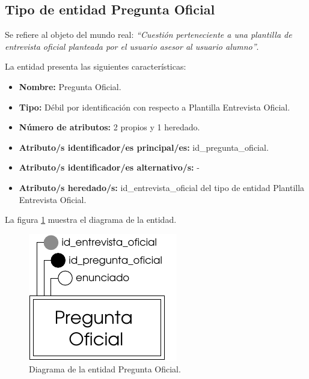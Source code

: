\subsection{Tipo de entidad Pregunta Oficial}

   \begin{description}

   \item[Definición] Se refiere al objeto del mundo real: \emph{``Cuestión
   perteneciente a una plantilla de entrevista oficial planteada por el usuario
   asesor al usuario alumno''}.

   \item[Características] La entidad presenta las siguientes características:
      \begin{itemize}
         \item \textbf{Nombre:} Pregunta Oficial.
         \item \textbf{Tipo:} Débil por identificación con respecto a
         Plantilla Entrevista Oficial.
         \item \textbf{Número de atributos:} 2 propios y 1 heredado.
         \item \textbf{Atributo/s identificador/es principal/es:} id\_pregunta\_oficial.
         \item \textbf{Atributo/s identificador/es alternativo/s:} -
         \item \textbf{Atributo/s heredado/s:} id\_entrevista\_oficial del tipo
         de entidad Plantilla Entrevista Oficial.
      \end{itemize}

   \item[Diagrama] La figura \ref{diagramaPregOfi} muestra el diagrama de la entidad.
   \item \begin{figure}[!ht]
            \begin{center}
            \includegraphics[]{07.Modelo_Entidad-Interrelacion/7.2.Analisis_Entidades/diagramas/preg_ofi.pdf}
            \caption{Diagrama de la entidad Pregunta Oficial.}
            \label{diagramaPregOfi}
            \end{center}
         \end{figure}


\end{description}
